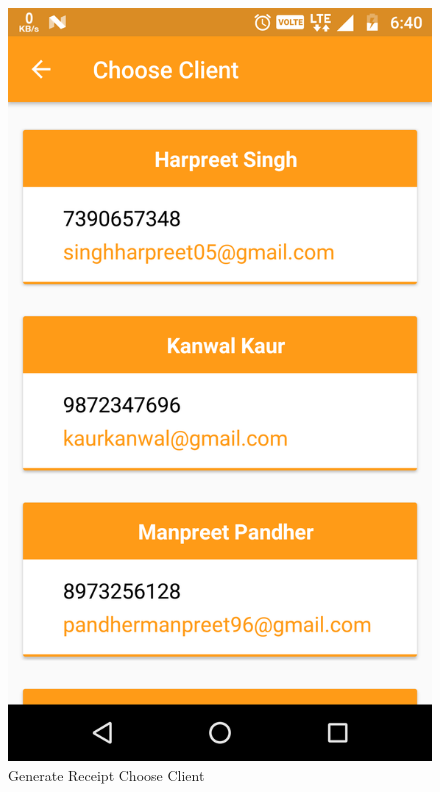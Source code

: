 \\
\begin{figure}[h]
	\centering
	\includegraphics[width=0.7\linewidth]{GenerateReceiptChooseClient}
	\caption{Generate Receipt Choose Client}
\end{figure}
\pagebreak

